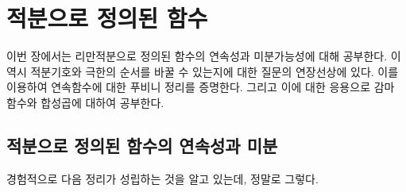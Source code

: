 \documentclass[11pt]{book}
\numberwithin{equation}{chapter}
\theoremstyle{definition}
\begin{document}
\chapter{적분으로 정의된 함수}

이번 장에서는 리만적분으로 정의된 함수의 연속성과 미분가능성에 대해 공부한다. 이 역시 적분기호와 극한의 순서를 바꿀 수 있는지에 대한 질문의 연장선상에 있다. 이를 이용하여 연속함수에 대한 푸비니 정리를 증명한다. 그리고 이에 대한 응용으로 감마 함수와 합성곱에 대하여 공부한다.

\section{적분으로 정의된 함수의 연속성과 미분}

경험적으로 다음 정리가 성립하는 것을 알고 있는데, 정말로 그렇다.
\end{document}
